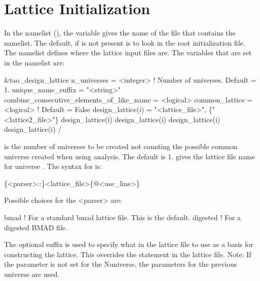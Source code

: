 \section{Lattice Initialization}
\label{s:init.lat} 

In the  namelist (), the  variable gives the name
of the file that contains the  namelist. The default, if  is
not present is to look in the \tao root initialization file. The  namelist
defines where the lattice input files are. The variables that are set in the 
namelist are:
\begin{example}
  &tao_design_lattice
    n_universes        = <integer>      ! Number of universes. Default = 1.
    unique_name_suffix = "<string>"
    combine_consecutive_elements_of_like_name = <logical>
    common_lattice = <logical>                        ! Default = False
    design_lattice(i) = "<lattice_file>", \{"<lattice2_file>"\}
    design_lattice(i)%
    design_lattice(i)%
    design_lattice(i)%
    design_lattice(i)%
  /
\end{example}

 is the number of universes to be created not counting the possible common universe
created when using  analysis. The default is 1.   gives the lattice
file name for universe .  The syntax for  is:
\begin{example}
  \{<parser>::\}<lattice_file>\{@<use_line>\}
\end{example}
Possible choices for the <parser> are:
\begin{example}
  bmad      ! For a standard bmad lattice file. This is the default.
  digested  ! For a digested BMAD file.
\end{example}
The  optional suffix is used to specify what  in the lattice file to use as
a basis for constructing the lattice. This overrides the  statement in the lattice file.
Note: If the  parameter is not set for the N\Th universe, the parameters for the 
previous universe are used.

